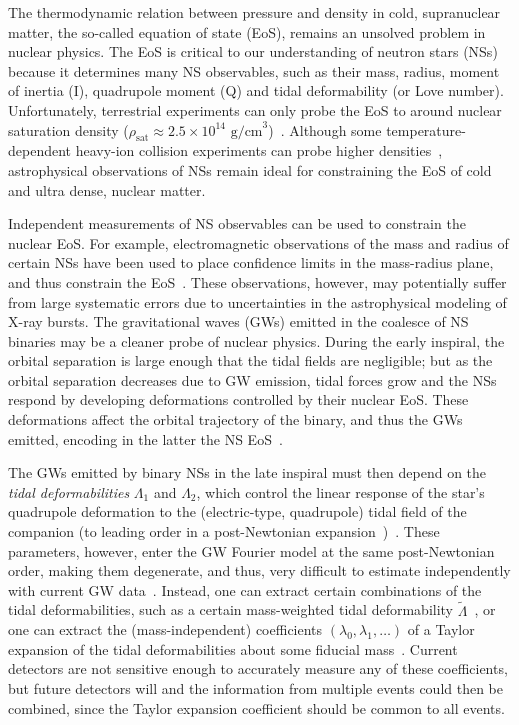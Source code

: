 \documentclass[prd,twocolumn,nofootinbib,superscriptaddress,amsmath,amssymb]{revtex4-1}
\begin{document}
The thermodynamic relation between pressure and density in cold, supranuclear matter, the so-called equation of state (EoS), remains an unsolved problem in nuclear physics. The EoS is critical to our understanding of neutron stars (NSs) because it determines many NS observables, such as their mass, radius, moment of inertia (I), quadrupole moment (Q) and tidal deformability (or Love number). Unfortunately, terrestrial experiments can only probe the EoS to around nuclear saturation density ($\rho_{\text{sat}} \approx 2.5 \times 10^{14} \text{ g/cm}^3$)~\cite{Li:HeavyIon,Tsang:SymmetryEnergy,Centelles:NeutronSkin,Li:CrossSections,Chen:SymEnergy}. Although some temperature-dependent heavy-ion collision experiments can probe higher densities~\cite{Danielewicz:2002pu}, astrophysical observations of NSs remain ideal for constraining the EoS of cold and ultra dense, nuclear matter.

Independent measurements of NS observables can be used to constrain the nuclear EoS. For example, electromagnetic observations of the mass and radius of certain NSs have been used to place confidence limits in the mass-radius plane, and thus constrain the EoS~\cite{guver,ozel-baym-guver,steiner-lattimer-brown,Lattimer2014,Ozel:2016oaf}. These observations, however, may potentially suffer from large systematic errors due to uncertainties in the astrophysical modeling of X-ray bursts. The gravitational waves (GWs) emitted in the coalesce of NS binaries may be a cleaner probe of nuclear physics. During the early inspiral, the orbital separation is large enough that the tidal fields are negligible; but as the orbital separation decreases due to GW emission, tidal forces grow and the NSs respond by developing deformations controlled by their nuclear EoS. These deformations affect the orbital trajectory of the binary, and thus the GWs emitted, encoding in the latter the NS EoS~\cite{hinderer-love,Flanagan2008}.

The GWs emitted by binary NSs in the late inspiral must then depend on the \emph{tidal deformabilities} $\Lambda_1$ and $\Lambda_2$, which control the linear response of the star's quadrupole deformation to the (electric-type, quadrupole) tidal field of the companion (to leading order in a post-Newtonian expansion~\cite{Blanchet:2013haa})~\cite{Flanagan2008,Vines:2011ud}. These parameters, however, enter the GW Fourier model at the same post-Newtonian order, making them degenerate, and thus, very difficult to estimate independently with current GW data~\cite{Wade:tidalCorrections}. Instead, one can extract certain combinations of the tidal deformabilities, such as a certain mass-weighted tidal deformability $\tilde{\Lambda}$~\cite{Favata:2013rwa,Wade:tidalCorrections}, or one can extract the (mass-independent) coefficients $(\lambda_{0},\lambda_{1},\ldots)$ of a Taylor expansion of the tidal deformabilities about some fiducial mass~\cite{delPozzo:TaylorTidal,Yagi:binLove}. Current detectors are not sensitive enough to accurately measure any of these coefficients, but future detectors will and the information from multiple events could then be combined, since the Taylor expansion coefficient should be common to all events. 
\end{document}
